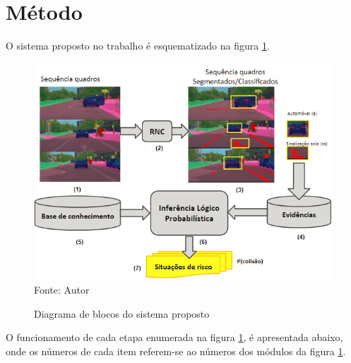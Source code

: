 \documentclass[
	12pt,				%
    oneside,			%
	a4paper,			%
	english,			%
	french,				%
	spanish,			%
	brazil,				%
	]{abntex2}
\begin{document}
\section {Método}

O sistema proposto no trabalho é esquematizado na figura \ref{fig:diagrama_de_blocos}.

\begin{figure}[H]
    \centering
    \caption{Diagrama de blocos do sistema proposto}
    \includegraphics[width=\textwidth]{diagrama_de_blocos_v6}\\
    Fonte: Autor\hfill
    \label{fig:diagrama_de_blocos}
\end{figure} 

O funcionamento de cada etapa enumerada na figura \ref{fig:diagrama_de_blocos}, é apresentada abaixo, onde os números de cada item referem-se ao números dos módulos da figura \ref{fig:diagrama_de_blocos}.
\end{document}
